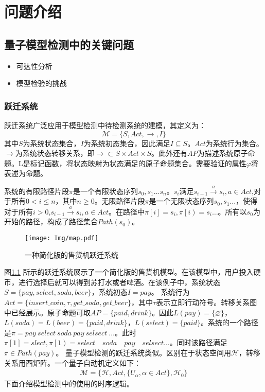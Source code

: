 \chapter{问题介绍}

\section{量子模型检测中的关键问题}
\begin{itemize}
  \item 可达性分析
  \item 模型检验的挑战
\end{itemize}
\subsection{跃迁系统}
跃迁系统广泛应用于模型检测中待检测系统的建模，其定义为\citep{baier2008principles}：
\begin{equation}
\mathcal{M}=\{S,Act,\rightarrow,I\}
\end{equation}
其中\(S\)为系统状态集合，\(I\)为系统初态集合，因此满足\(I\subseteq S\)。\(Act\)为系统行为集合。\(\rightarrow\)为系统状态转移关系，即\(\rightarrow\subset S\times Act\times S\)。此外还有\(AP\)为描述系统原子命题。L是标记函数，将状态映射为状态满足的原子命题集合。需要验证的属性\(\varphi\)将表述为命题。


系统的有限路径片段\(\pi\)是一个有限状态序列\(s_0,s_1\ldots s_n\)。\(s_i\)满足\(s_{i-1}\overset{a}{\rightarrow}s_i,a\in Act\),对于所有\(0<i\leq n\)，其中\(n\geq 0 \)。无限路径片段\(\pi\)是一个无限状态序列\(s_0,s_1\ldots\)，使得对于所有\(i>0\),\(s_{i-1} \overset{a}{\rightarrow}  s_i,a\in Act\)。在路径中\(\pi\left[i\right]=s_i,\pi\left[i\right)=s_i\ldots\)。所有以\(s_0\)为开始的路径，构成了路径集合\(Path\left(s_0\right)\)。

\begin{figure}[!htbp]
    \centering
    \texttt{[image: Img/map.pdf]}
    \caption{一种简化版的售货机跃迁系统}
    \label{fig:transition-system}
\end{figure}

图\ref{fig:transition-system} 所示的跃迁系统展示了一个简化版的售货机模型。在该模型中，用户投入硬币，进行选择后就可以得到苏打水或者啤酒。在该例子中，系统状态\(S=\{pay,select,soda,beer\}\)，系统初态\(I=pay\)。
系统行为\(Act=\{insert\_coin,\tau,get\_soda,get\_beer\}\)，其中\(\tau\)表示立即行动符号。转移关系图中已经展示。原子命题可取\(AP=\{paid,drink\}\)。因此\(L\left( pay \right)=\{\varnothing\}\)，\(L\left(soda\right)=L\left(beer\right)=\{paid,drink\}\)，\(L\left(select\right)=\{paid\}\)。系统的一个路径是\(\pi=pay\ select\ soda\ pay\ selsect\ \ldots\)。此时\(\pi\left[1\right]=slect,\pi\left[1\right)=select\quad soda\quad pay\quad selsect\ldots\)。同时该路径满足\(\pi\in Path\left(pay\right)\)。
量子模型检测的跃迁系统类似。区别在于状态空间用\(\mathcal{H}\)，转移关系用酉矩阵。一个量子自动机定义如下：
\begin{align}
    \mathcal{M}=\{\mathcal{H},Act,\{U_\alpha,\alpha\in Act\},\mathcal{H}_0\}
\end{align}
下面介绍模型检测中的使用的时序逻辑。

